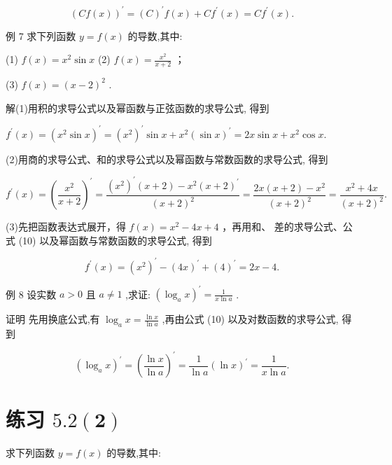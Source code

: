 \documentclass[10pt]{article}
\begin{document}
\[
{\left( Cf\left( x\right) \right) }^{\prime } = {\left( C\right) }^{\prime }f\left( x\right)  + C{f}^{\prime }\left( x\right)  = C{f}^{\prime }\left( x\right) .
\]

例 7 求下列函数 \(y = f\left( x\right)\) 的导数,其中:

(1) \(f\left( x\right)  = {x}^{2}\sin x\) (2) \(f\left( x\right)  = \frac{{x}^{2}}{x + 2}\) ；

(3) \(f\left( x\right)  = {\left( x - 2\right) }^{2}\) .

解(1)用积的求导公式以及幂函数与正弦函数的求导公式, 得到

\({f}^{\prime }\left( x\right)  = {\left( {x}^{2}\sin x\right) }^{\prime } = {\left( {x}^{2}\right) }^{\prime }\sin x + {x}^{2}{\left( \sin x\right) }^{\prime } = {2x}\sin x + {x}^{2}\cos x.\)



(2)用商的求导公式、和的求导公式以及幂函数与常数函数的求导公式, 得到

\[
{f}^{\prime }\left( x\right)  = {\left( \frac{{x}^{2}}{x + 2}\right) }^{\prime } = \frac{{\left( {x}^{2}\right) }^{\prime }\left( {x + 2}\right)  - {x}^{2}{\left( x + 2\right) }^{\prime }}{{\left( x + 2\right) }^{2}} = \frac{{2x}\left( {x + 2}\right)  - {x}^{2}}{{\left( x + 2\right) }^{2}} = \frac{{x}^{2} + {4x}}{{\left( x + 2\right) }^{2}}.
\]

(3)先把函数表达式展开，得 \(f\left( x\right)  = {x}^{2} - {4x} + 4\) ，再用和、 差的求导公式、公式 (10) 以及幂函数与常数函数的求导公式, 得到

\[
{f}^{\prime }\left( x\right)  = {\left( {x}^{2}\right) }^{\prime } - {\left( 4x\right) }^{\prime } + {\left( 4\right) }^{\prime } = {2x} - 4.
\]

例 8 设实数 \(a > 0\) 且 \(a \neq  1\) ,求证: \({\left( {\log }_{a}x\right) }^{\prime } = \frac{1}{x\ln a}\) .

证明 先用换底公式,有 \({\log }_{a}x = \frac{\ln x}{\ln a}\) ,再由公式 (10) 以及对数函数的求导公式, 得到

\[
{\left( {\log }_{a}x\right) }^{\prime } = {\left( \frac{\ln x}{\ln a}\right) }^{\prime } = \frac{1}{\ln a}{\left( \ln x\right) }^{\prime } = \frac{1}{x\ln a}.
\]

\section*{练习 \(\mathbf{{5.2}\left( 2\right) }\)}

求下列函数 \(y = f\left( x\right)\) 的导数,其中:
\end{document}
